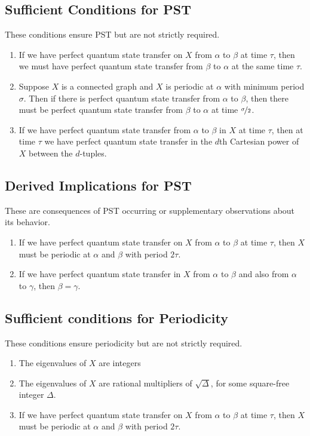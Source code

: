 \documentclass[aps]{revtex4-2}
\begin{document}
\subsection{Sufficient Conditions for PST}
These conditions ensure PST but are not strictly required.
\begin{enumerate}
    \item If we have perfect quantum state transfer on $X$ from $\alpha$ to $\beta$ at time $\tau$, then we must have perfect quantum state transfer from $\beta$ to $\alpha$ at the same time $\tau$.
    \item Suppose $X$ is a connected graph and $X$ is periodic at $\alpha$ with minimum period $\sigma$. Then if there is perfect quantum state transfer from $\alpha$ to $\beta$, then there must be perfect quantum state transfer from $\beta$ to $\alpha$ at time $\nicefrac{\sigma}{2}$.
    \item If we have perfect quantum state transfer from $\alpha$ to $\beta$ in $X$ at time $\tau$, then at time $\tau$ we have perfect quantum state transfer in the $d$th Cartesian power of $X$ between the $d$-tuples.
\end{enumerate}
\subsection{Derived Implications for PST}
These are consequences of PST occurring or supplementary observations about its behavior.
\begin{enumerate}
    \item If we have perfect quantum state transfer on $X$ from $\alpha$ to $\beta$ at time $\tau$, then $X$ must be periodic at $\alpha$ and $\beta$ with period $2\tau$.
    \item If we have perfect quantum state transfer in $X$ from $\alpha$ to $\beta$ and also from $\alpha$ to $\gamma$, then $\beta=\gamma$.
\end{enumerate}
\subsection{Sufficient conditions for Periodicity}
These conditions ensure periodicity but are not strictly required.
\begin{enumerate}
    \item The eigenvalues of $X$ are integers
    \item The eigenvalues of $X$ are rational multipliers of $\sqrt{\Delta}$, for some square-free integer $\Delta$.
    \item If we have perfect quantum state transfer on $X$ from $\alpha$ to $\beta$ at time $\tau$, then $X$ must be periodic at $\alpha$ and $\beta$ with period $2\tau$.
\end{enumerate}
\end{document}
